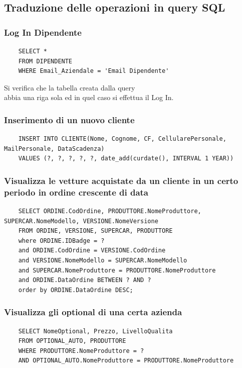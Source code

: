 \documentclass[11pt]{article}
\begin{document}
\newpage

\lstset{style=sqlStyle}

\subsection{Traduzione delle operazioni in query SQL}

\subsubsection*{Log In Dipendente}

\begin{lstlisting}
    SELECT * 
    FROM DIPENDENTE 
    WHERE Email_Aziendale = 'Email Dipendente'
\end{lstlisting}
Si verifica che la tabella creata dalla query \\
abbia una riga sola ed in quel caso si effettua il Log In.

\subsubsection*{Inserimento di un nuovo cliente}

\begin{lstlisting}
    INSERT INTO CLIENTE(Nome, Cognome, CF, CellularePersonale, MailPersonale, DataScadenza)
    VALUES (?, ?, ?, ?, ?, date_add(curdate(), INTERVAL 1 YEAR))
\end{lstlisting}

\subsubsection*{Visualizza le vetture acquistate da un cliente in un certo
periodo in ordine crescente di data}

\begin{lstlisting}
    SELECT ORDINE.CodOrdine, PRODUTTORE.NomeProduttore, SUPERCAR.NomeModello, VERSIONE.NomeVersione
    FROM ORDINE, VERSIONE, SUPERCAR, PRODUTTORE
    where ORDINE.IDBadge = ?
    and ORDINE.CodOrdine = VERSIONE.CodOrdine
    and VERSIONE.NomeModello = SUPERCAR.NomeModello
    and SUPERCAR.NomeProduttore = PRODUTTORE.NomeProduttore
    and ORDINE.DataOrdine BETWEEN ? AND ?
    order by ORDINE.DataOrdine DESC;
\end{lstlisting}

\subsubsection*{Visualizza gli optional di una certa azienda}
\begin{lstlisting}
    SELECT NomeOptional, Prezzo, LivelloQualita
    FROM OPTIONAL_AUTO, PRODUTTORE
    WHERE PRODUTTORE.NomeProduttore = ?
    AND OPTIONAL_AUTO.NomeProduttore = PRODUTTORE.NomeProduttore
\end{lstlisting}
\end{document}
